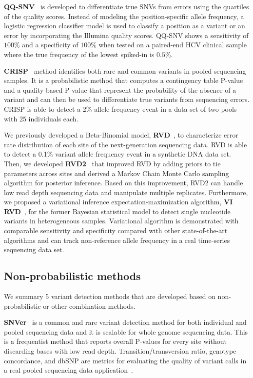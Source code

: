 \documentclass[a4,center,fleqn]{NAR}
\begin{document}
\textbf{QQ-SNV}~\citep{VanderBorght2015} is developed to differentiate true SNVs from errors using the quartiles of the quality scores.
Instead of modeling the position-specific allele frequency, a logistic regression classifier model is used to classify a position as a variant or an error by incorporating the Illumina quality scores.
QQ-SNV shows a sensitivity of $100\%$ and a specificity of $100\%$ when tested on a paired-end HCV clinical sample where the true frequency of the lowest spiked-in is $0.5\%$.


\textbf{CRISP}~\citep{Bansal2010} method identifies both rare and common variants in pooled sequencing samples.
It is a probabilistic method that computes a contingency table P-value and a quality-based P-value that represent the probability of the absence of a variant and can then be used to differentiate true variants from sequencing errors.
CRISP is able to detect a 2\% allele frequency event in a data set of two pools with 25 individuals each.


We previously developed a Beta-Binomial model, \textbf{RVD}~\citep{Flaherty2012}, to characterize error rate distribution of each site of the next-generation sequencing data.
RVD is able to detect a 0.1\% variant allele frequency event in a synthetic DNA data set.
Then, we developed \textbf{RVD2}~\citep{He2015} that improved RVD by adding priors to tie parameters across sites and derived a Markov Chain Monte Carlo sampling algorithm for posterior inference.
Based on this improvement, RVD2 can handle low read depth sequencing data and manipulate multiple replicates.
Furthermore, we proposed a variational inference expectation-maximization algorithm, \textbf{VI RVD}~\citep{zhang2016variational}, for the former Bayesian statistical model to detect single nucleotide variants in heterogeneous samples.
Variational algorithm is demonstrated with comparable sensitivity and specificity compared with other state-of-the-art algorithms and can track non-reference allele frequency in a real time-series sequencing data set.


\subsection{Non-probabilistic methods}

We summary 5 variant detection methods that are developed based on non-probabilistic or other combination methods.

\textbf{SNVer}~\citep{Wei2011} is a common and rare variant detection method for both individual and pooled sequencing data and it is scalable for whole genome sequencing data.
This is a frequentist method that reports overall P-values for every site without discarding bases with low read depth.
Transition/transversion ratio, genotype concordance, and dbSNP are metrics for evaluating the quality of variant calls in a real pooled sequencing data application~\citep{depristo2011framework}.
\end{document}
